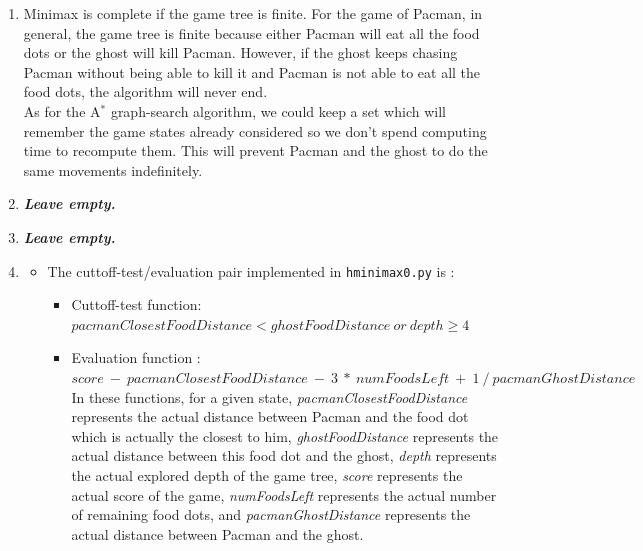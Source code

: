 \documentclass{article}
\begin{document}
\begin{enumerate}[label=\alph*.,leftmargin=*]
    \item Minimax is complete if the game tree is finite. For the game of Pacman, in general, the game tree is finite because either Pacman will eat all the food dots or the ghost will kill Pacman. However, if the ghost keeps chasing Pacman without being able to kill it and Pacman is not able to eat all the food dots, the algorithm will never end.\\
    As for the A$^*$ graph-search algorithm, we could keep a set which will remember the game states already considered so we don't spend computing time to recompute them. This will prevent Pacman and the ghost to do the same movements indefinitely.
    \item \textbf{\textit{Leave empty.}}
    \item \textbf{\textit{Leave empty.}}
	\item 
		\begin{itemize}
			\item The cuttoff-test/evaluation pair implemented in \texttt{hminimax0.py} is :
				\begin{itemize}
					\item Cuttoff-test function: $pacmanClosestFoodDistance < ghostFoodDistance \ or \ depth \geq 4$
					\item Evaluation function : $score \ - \ pacmanClosestFoodDistance \ - \ 3 \ * \ numFoodsLeft \ + \ 1 \ / \ pacmanGhostDistance$\\
					
					In these functions, for a given state, \textit{pacmanClosestFoodDistance} represents the actual distance between Pacman and the food dot which is actually the closest to him, \textit{ghostFoodDistance} represents the actual distance between this food dot and the ghost, \textit{depth} represents the actual explored depth of the game tree, \textit{score} represents the actual score of the game, \textit{numFoodsLeft} represents the actual number of remaining food dots, and \textit{pacmanGhostDistance} represents the actual distance between Pacman and the ghost.\\
					

\end{itemize}
\end{itemize}
\end{enumerate}
\end{document}
